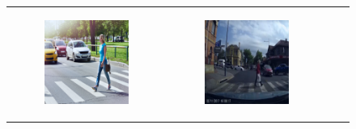 \begin{figure}
\begin{tabular}{r p{\horspace} p{\horspace} p{\horspace}}
\begin{subfigure}[b]{\subfigwidth}
        \includegraphics[width=\subfigwidth]{images/vit_attention/2/img.png}
    \end{subfigure} 
    \hfill &
    \begin{subfigure}[b]{\subfigwidth}
        \includegraphics[width=\subfigwidth]{images/vit_attention/4/img.png}

\end{subfigure}
\end{tabular}
\end{figure}
